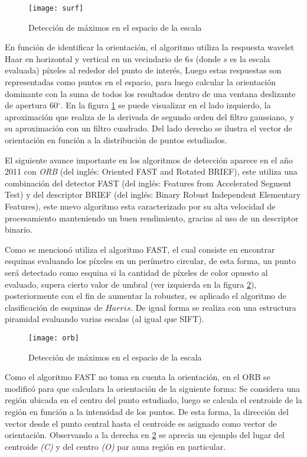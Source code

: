 \begin{figure}[H]
	\centering
	\texttt{[image: surf]}
	\caption[SURF - Espacio de escalas]{Detección de máximos en el espacio de la escala}
	\label{imagen:surf}
\end{figure}

En función de identificar la orientación, el algoritmo utiliza la respuesta wavelet Haar en horizontal y vertical en un vecindario de 6$s$ (donde $s$ es la escala evaluada) píxeles al rededor del punto de interés, Luego estas respuestas son representadas como puntos en el espacio, para luego calcular la orientación dominante con la suma de todos los resultados dentro de una ventana deslizante de apertura 60$^\circ$. En la figura \ref{imagen:surf} se puede visualizar en el lado izquierdo, la aproximación que realiza de la derivada de segundo orden del filtro gaussiano, y su aproximación con un filtro cuadrado. Del lado derecho se ilustra el vector de orientación en función a la distribución de puntos estudiados.

El siguiente avance importante en los algoritmos de detección aparece en el año 2011 con \textit{ORB} \cite{orb} (del inglés: Oriented FAST and Rotated BRIEF), este utiliza una combinación del detector FAST (del inglés: Features from Accelerated Segment Test) y del descriptor BRIEF (del inglés: Binary Robust Independent Elementary Features), este nuevo algoritmo esta caracterizado por su alta velocidad de procesamiento manteniendo un buen rendimiento, gracias al uso de un descriptor binario. 

Como se mencionó utiliza el algoritmo FAST, el cual consiste en encontrar esquinas evaluando los píxeles en un perímetro circular, de esta forma, un punto será detectado como esquina si la cantidad de píxeles de color opuesto al evaluado, supera cierto valor de umbral (ver izquierda en la figura \ref{imagen:orb}), posteriormente con el fin de aumentar la robustez, es aplicado el algoritmo de clasificación de esquinas de $Harris$. De igual forma se realiza con una estructura piramidal evaluando varias escalas (al igual que SIFT).

\begin{figure}[H]
	\centering
	\texttt{[image: orb]}
	\caption[ORB - Espacio de escalas]{Detección de máximos en el espacio de la escala}
	\label{imagen:orb}
\end{figure}

Como el algoritmo FAST no toma en cuenta la orientación, en el ORB se modificó para que calculara la orientación de la siguiente forma: Se considera una región ubicada en el centro del punto estudiado, luego se calcula el centroide de la región en función a la intensidad de los puntos. De esta forma, la dirección del vector desde el punto central  hasta el centroide es asignado como vector de orientación. Observando a la derecha en \ref{imagen:orb} se aprecia un ejemplo del lugar del centroide \textit{(C)} y del centro \textit{(O)} par auna región en particular.


